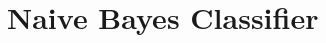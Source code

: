 \documentclass[a4paper,12px]{article}
\begin{document}
\section{Naive Bayes Classifier}



% 
% 
\end{document}
